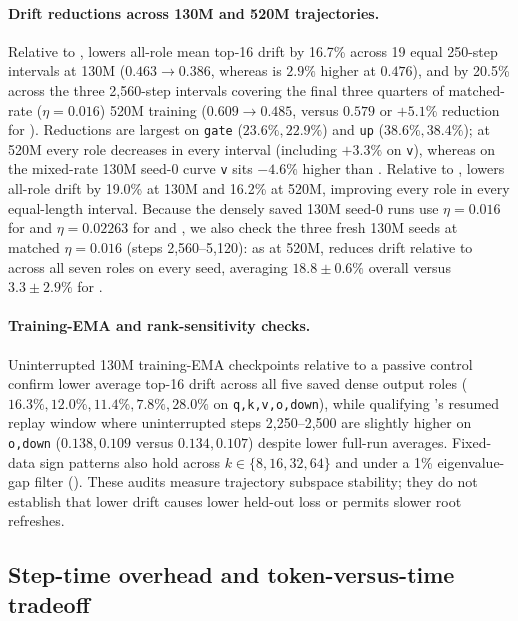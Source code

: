 \paragraph{Drift reductions across 130M and 520M trajectories.}
Relative to ,  lowers all-role mean top-16 drift by 16.7\% across 19 equal 250-step intervals at 130M ($0.463\to0.386$, whereas  is $2.9\%$ higher at $0.476$), and by 20.5\% across the three 2,560-step intervals covering the final three quarters of matched-rate ($\eta=0.016$) 520M training ($0.609\to0.485$, versus $0.579$ or $+5.1\%$ reduction for ). Reductions are largest on \texttt{gate} ($23.6\%,22.9\%$) and \texttt{up} ($38.6\%,38.4\%$); at 520M every role decreases in every interval (including $+3.3\%$ on \texttt{v}), whereas on the mixed-rate 130M seed-0 curve \texttt{v} sits $-4.6\%$ higher than . Relative to ,  lowers all-role drift by 19.0\% at 130M and 16.2\% at 520M, improving every role in every equal-length interval. Because the densely saved 130M seed-0 runs use $\eta=0.016$ for  and $\eta=0.02263$ for  and , we also check the three fresh 130M seeds at matched $\eta=0.016$ (steps 2,560--5,120): as at 520M,  reduces drift relative to  across all seven roles on every seed, averaging $18.8\pm0.6\%$ overall versus $3.3\pm2.9\%$ for .

\paragraph{Training-EMA and rank-sensitivity checks.}
Uninterrupted 130M training-EMA checkpoints relative to a passive  control confirm lower average top-16 drift across all five saved dense output roles ($16.3\%,12.0\%,11.4\%,7.8\%,28.0\%$ on \texttt{q,k,v,o,down}), while qualifying 's resumed replay window where uninterrupted steps 2,250--2,500 are slightly higher on \texttt{o,down} ($0.138,0.109$ versus $0.134,0.107$) despite lower full-run averages. Fixed-data sign patterns also hold across $k\in\{8,16,32,64\}$ and under a 1\% eigenvalue-gap filter (). These audits measure trajectory subspace stability; they do not establish that lower drift causes lower held-out loss or permits slower root refreshes.

\subsection{Step-time overhead and token-versus-time tradeoff}
\label{sec:pareto}

